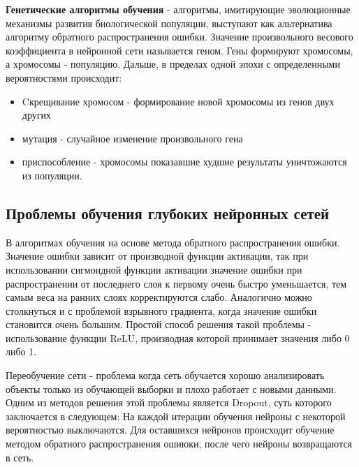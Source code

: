 \textbf{Генетические алгоритмы обучения} - алгоритмы, имитирующие эволюционные механизмы развития биологической популяции, выступают как альтернатива алгоритму обратного распространения ошибки. Значение произвольного весового коэффициента в нейронной сети называется геном. Гены формируют хромосомы, а хромосомы - популяцию. Дальше, в пределах одной эпохи с определенными вероятностями происходит: 
 \begin{itemize}
     \item Cкрещивание хромосом - формирование новой хромосомы из генов двух других
     \item мутация - случайное изменение произвольного гена
     \item приспособление - хромосомы показавшие худшие результаты уничтожаются из популяции.
 \end{itemize}

% 

\subsection{Проблемы обучения глубоких нейронных сетей}

В алгоритмах обучения на основе метода обратного распространения ошибки. Значение ошибки зависит от производной функции активации, так при использовании сигмоидной функции активации значение ошибки при распространении от последнего слоя к первому очень быстро уменьшается, тем самым веса на ранних слоях корректируются слабо. Аналогично можно столкнуться и с проблемой взрывного градиента, когда значение ошибки становится очень большим. Простой способ решения такой проблемы - использование функции ReLU, производная которой принимает значения либо 0 либо 1.

Переобучение сети - проблема когда сеть обучается хорошо анализировать объекты только из обучающей выборки и плохо работает с новыми данными. Одним из методов решения этой проблемы является Dropout, суть которого заключается в следующем: На каждой итерации обучения нейроны с некоторой вероятностью выключаются. Для оставшихся нейронов происходит обучение методом обратного распространения ошиюки, после чего нейроны возвращаются в сеть. 




\clearpage